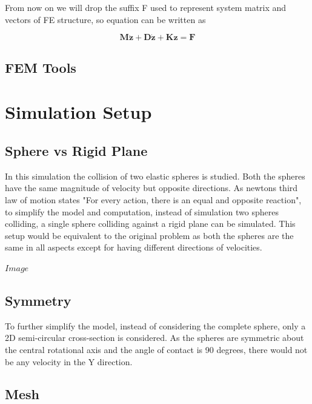 From now on we will drop the suffix F used to represent system matrix
and vectors of FE structure, so equation can be written as 

\begin{equation}
\mathbf{M}\ddot{\mathbf{\boldsymbol{z}}}+\mathbf{D}\mathbf{\dot{z}}+\mathbf{K}\mathbf{z}=\mathbf{F}\label{final equtation of motion FE}
\end{equation}


\subsection{FEM Tools}



\section{Simulation Setup}
\subsection{Sphere vs Rigid Plane}
In this simulation the collision of two elastic spheres is studied. Both the spheres have the same magnitude of velocity but opposite directions. As newtons third law of motion states "For every action, there is an equal and opposite reaction", to simplify the model and computation, instead of simulation two spheres colliding, a single sphere colliding against a rigid plane can be simulated. This setup would be equivalent to the original problem as both the spheres are the same in all aspects except for having different directions of velocities.

$Image$

\subsection{Symmetry}
To further simplify the model, instead of considering the complete sphere, only a 2D semi-circular cross-section is considered. As the spheres are symmetric about the central rotational axis and the angle of contact is 90 degrees, there would not be any velocity in the Y direction. 

\subsection{Mesh}

